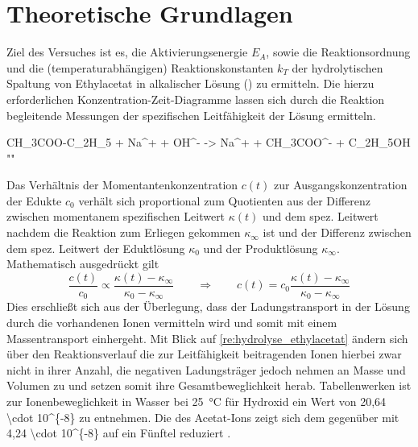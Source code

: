 \chapter{Theoretische Grundlagen}
	Ziel des Versuches ist es, die Aktivierungsenergie \(E_A\), sowie die Reaktionsordnung und die (temperaturabhängigen)
	Reaktionskonstanten \(k_T\)	der hydrolytischen Spaltung von Ethylacetat in alkalischer Lösung () zu ermitteln. Die hierzu
	erforderlichen Konzentration-Zeit-Diagramme lassen sich durch die Reaktion begleitende Messungen der spezifischen
	Leitfähigkeit der Lösung ermitteln.
	\begin{reaction}
		CH_3COO-C_2H_5 + Na^+ + OH^- -> Na^+ + CH_3COO^- + C_2H_5OH
		"\label{re:hydrolyse_ethylacetat}"
	\end{reaction}
	Das Verhältnis der Momentantenkonzentration \(c(t)\) zur Ausgangskonzentration der Edukte \(c_0\) verhält sich proportional
	zum Quotienten aus der Differenz zwischen momentanem spezifischen Leitwert \(\kappa(t)\) und dem spez. Leitwert nachdem
	die Reaktion zum Erliegen gekommen \(\kappa_{\infty}\) ist und der Differenz zwischen dem spez. Leitwert der Eduktlösung \(\kappa_0\)
	und der Produktlösung \(\kappa_{\infty}\).
	Mathematisch ausgedrückt gilt
	\begin{equation}
		\frac{c(t)}{c_0} \propto \frac{\kappa(t) - \kappa_{\infty}}{\kappa_0 - \kappa_{\infty}} \qquad \Rightarrow \qquad c(t) = c_0 \frac{\kappa(t) - \kappa_{\infty}}{\kappa_0 - \kappa_{\infty}}
		\label{eq:leitwert zu konzentration}
	\end{equation}
	Dies erschließt sich aus der Überlegung, dass der Ladungstransport in der Lösung durch die vorhandenen Ionen vermitteln wird
	und somit mit einem Massentransport einhergeht. Mit Blick auf \cref{re:hydrolyse_ethylacetat} ändern sich über den Reaktionsverlauf die zur Leitfähigkeit
	beitragenden Ionen hierbei zwar nicht in ihrer Anzahl, die negativen Ladungsträger jedoch nehmen an Masse und Volumen
	zu und setzen somit ihre Gesamtbeweglichkeit herab. Tabellenwerken ist zur Ionenbeweglichkeit in Wasser bei \SI{25}{\celsius}
	für Hydroxid ein Wert von \SI{20,64 \cdot 10^{-8}}{} zu entnehmen. Die des Acetat-Ions zeigt sich dem gegenüber mit
	\SI{4,24 \cdot 10^{-8}}{} auf ein Fünftel reduziert \cite{Einstieg.in.die.Physikalische.Chemie.fuer.Nebenfaechler.Bechmann.2016}.\par\medskip
